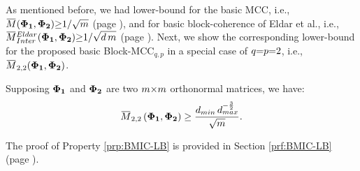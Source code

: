 As mentioned before, we had lower-bound for the basic MCC, i.e., $\overbar{M}(\myPhiOne,\myPhiTwo) \sgeq 1/\sqrt{m}$ (page \pageref{txt:BasicMCCBounds}), and for basic block-coherence of Eldar et al., i.e., $\overbar{M}^{Eldar}_{Inter}(\myPhiOne,\myPhiTwo) \sgeq 1/\sqrt{d \, m}$ (page \pageref{txt:BasicEldarCCBound}).
Next, we show the corresponding lower-bound for the proposed basic Block-MCC$_{q,p}$ in a special case of $q {=} p {=} 2$, i.e., $\overbar{M}_{2,2} (\myPhiOne , \myPhiTwo)$.
\begin{property}
\label{prp:BMIC-LB} 
Supposing $\boldsymbol{\Phi}_{\boldsymbol{1}}$ and $\boldsymbol{\Phi}_{\boldsymbol{2}}$ are two $m {\times} m$ orthonormal matrices, we have:
\begin{equation}
\overbar{M}_{2,2} \myparanthese{\myPhiOne , \myPhiTwo} \geq
\frac{d_{min} \, d_{max}^{-\frac32}}{\sqrt{m}}.
\end{equation}
\end{property}
The proof of Property \ref{prp:BMIC-LB} is provided in Section \ref{prf:BMIC-LB} (page \pageref{prf:BMIC-LB}).